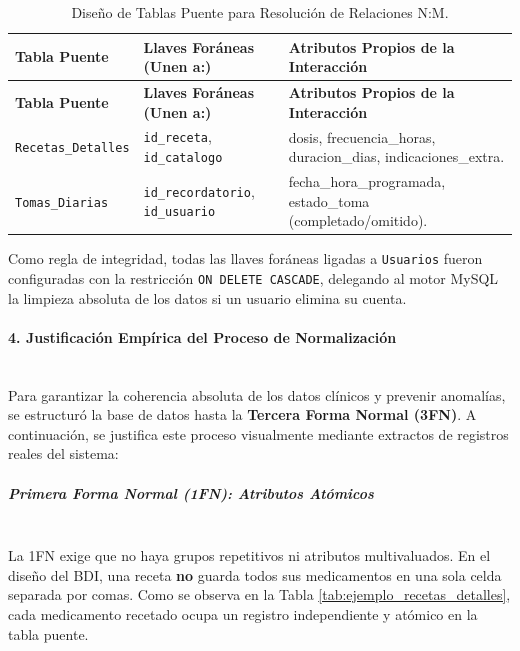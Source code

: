 \begin{longtable}{|p{}|p{}|p{}|}
\caption{Diseño de Tablas Puente para Resolución de Relaciones N:M.}
\label{tab:llaves_tablas_puente} \\
\hline
\textbf{Tabla Puente} & \textbf{Llaves Foráneas (Unen a:)} & \textbf{Atributos Propios de la Interacción} \\
\hline
\endfirsthead
\hline
\textbf{Tabla Puente} & \textbf{Llaves Foráneas (Unen a:)} & \textbf{Atributos Propios de la Interacción} \\
\hline
\endhead
\hline
\endfoot
\hline
\endlastfoot
\texttt{Recetas\_Detalles} & \texttt{id\_receta}, \texttt{id\_catalogo} & dosis, frecuencia\_horas, duracion\_dias, indicaciones\_extra. \\
\hline
\texttt{Tomas\_Diarias} & \texttt{id\_recordatorio}, \texttt{id\_usuario} & fecha\_hora\_programada, estado\_toma (completado/omitido). \\
\hline
\end{longtable}

Como regla de integridad, todas las llaves foráneas ligadas a \texttt{Usuarios} fueron configuradas con la restricción \texttt{ON DELETE CASCADE}, delegando al motor MySQL la limpieza absoluta de los datos si un usuario elimina su cuenta.

\paragraph{4. Justificación Empírica del Proceso de Normalización} \leavevmode \\

Para garantizar la coherencia absoluta de los datos clínicos y prevenir anomalías, se estructuró la base de datos hasta la \textbf{Tercera Forma Normal (3FN)}. A continuación, se justifica este proceso visualmente mediante extractos de registros reales del sistema:

\subparagraph{Primera Forma Normal (1FN): Atributos Atómicos} \leavevmode \\
La 1FN exige que no haya grupos repetitivos ni atributos multivaluados. En el diseño del BDI, una receta \textbf{no} guarda todos sus medicamentos en una sola celda separada por comas. Como se observa en la Tabla \ref{tab:ejemplo_recetas_detalles}, cada medicamento recetado ocupa un registro independiente y atómico en la tabla puente.

